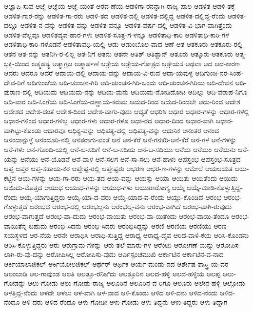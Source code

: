 {ಆಜ್ಞಾಪಿ-ಸುವ
ಆಜ್ಞೆ
ಆಜ್ಞೆಯ
ಆಜ್ಞೆ-ಯಂತೆ
ಆಠವ-ಣೆಯ
ಆಡಳಿಗಾ-ರನನ್ನಾಗಿ-ರಾಜ್ಯ-ಪಾಲ
ಆಡಳಿತ
ಆಡಳಿ-ತಕ್ಕೆ
ಆಡಳಿತ-ಗಾರ-ರನ್ನು
ಆಡಳಿತ-ಗಾ-ರರು
ಆಡಳಿ-ತದ
ಆಡಳಿತ-ದಲ್ಲಿ
ಆಡಳಿತ-ದಲ್ಲಿದ್ದ
ಆಡಳಿತ-ದಲ್ಲಿದ್ದ-ರೆಂದು
ಆಡಳಿತ-ದಲ್ಲೂ
ಆಡಳಿತ-ನ-ವನ್ನು
ಆಡಳಿತ-ವನ್ನು
ಆಡಳಿತ-ವನ್ನೂ
ಆಡಳಿತ-ವರ್ಷ-ದಲ್ಲಿ
ಆಡಳಿತ-ವಿ-ಭಾಗ-ವಾಗಿತ್ತೆಂದು
ಆಡಳಿತ-ವೆಲ್ಲವೂ
ಆಡಳಿತವ್ಯವ-ಹಾರ-ಗಳು
ಆಡಳಿತ-ಸೂತ್ರ-ಗ-ಳನ್ನೂ
ಆಡಳಿತಾಧಿ-ಕಾರಿ
ಆಡಳಿತಾಧಿ-ಕಾರಿ-ಗಳ
ಆಡಳಿತಾಧಿ-ಕಾರಿ-ಗಳೊಡನೆ
ಆಡಳಿತಾವಧಿ-ಯಲ್ಲಿ
ಆಡು
ಆಡುಂಬೊಲ-ವಾದ
ಆಣೆ
ಆತ
ಆತಕೂರು
ಆತಕೂರು-ರಲ್ಲಿ
ಆತನ
ಆತ-ನನ್ನು
ಆತನಿಗಿ-ರ-ಲಿಲ್ಲ
ಆತ-ನಿಗೆ
ಆತನು
ಆತನೇ
ಆತಿಶ್
ಆತಿಶ್ಖಾನ್
ಆತೂರು
ಆತ್ಕೂರು-ಆತಕೂರು
ಆತ್ಮ-ಭಕ್ತಿ-ಯಿಂದ
ಆತ್ಮಹತ್ಯೆ
ಆತ್ಮಾಗ್ರಜ
ಆತ್ಮಾರ್ಪಣೆ
ಆತ್ರೇಯ
ಆತ್ರೇಯ-ಗೋತ್ರದ
ಆತ್ರೇಯಸ
ಆಥವಾ
ಆದ
ಆದ-ಕಾರಣ
ಆದರು
ಆದರೂ
ಆದರೆ
ಆದಾಯ-ದಲ್ಲಿ
ಆದಾಯ-ವನ್ನು
ಆದಾಯ-ವಿ-ರುವ
ಆದಾ-ಯವುಳ್ಳ
ಆದಿಗುಂಜ-ನರ-ಸಿಂಹ-ದೇವ-ರಿಗೆ
ಆದಿಗುಂಜೆಯ
ಆದಿ-ಚುಂಚನ-ಗಿರಿ
ಆದಿ-ಚುಂಚನ-ಗಿರಿ-ಒಂದು
ಆದಿ-ಚುಂಚನ-ಗಿರಿಯ
ಆದಿ-ದೇವನ
ಆದಿ-ಪುರಾಣ-ದಲ್ಲಿ
ಆದಿಯಮ
ಆದಿಯಮ-ನನ್ನು
ಆದಿಯ-ಮನು
ಆದಿಯಮ-ನೋಡಿದೋಟ
ಆದಿಲ್ನು
ಆದಿ-ವರಾಹ-ನಿಗೂ
ಆದಿ-ವಾರ
ಆದಿ-ಸಿಂಗೆಯ
ಆದಿ-ಸಿಂಗೆಯ-ದಣ್ಣಾಯ-ಕರುಮ
ಆದುದ-ರಿಂದ
ಆದುದ-ರಿಂದಲೇ
ಆದು-ರಿಂದ
ಆದೇಶ
ಆದೇಶದ
ಆದೇಶ-ದಂತೆ
ಆದೇಶ-ದಿಂದ
ಆದೇಶ-ವಾಗು-ವುದು
ಆದ್ಯತೆ
ಆಧರಿಸಿ
ಆಧಾರ
ಆಧಾರ-ಗಳನ್ನು
ಆಧಾರ-ಗಳಲ್ಲಿ
ಆಧಾರ-ಗಳಿಂದ
ಆಧಾರ-ಗಳಿಲ್ಲ
ಆಧಾರ-ಗಳು
ಆಧಾರ-ಗಳೂ
ಆಧಾ-ರದ
ಆಧಾರ-ದಿಂದ
ಆಧಾರ-ವಾಗಿ
ಆಧಾರ-ವಾಗಿಟ್ಟು-ಕೊಂಡು
ಆಧಾರವೂ
ಆಧಿಕ್ಯ-ವನ್ನು
ಆಧಿಪತ್ಯ-ದಲ್ಲಿ
ಆಧಿಪತ್ಯ-ವನ್ನು
ಆಧುನಿಕ
ಆನಂತರ
ಆನಂದ
ಆನಂದಾನ್ಪುಳ್ಳೆ
ಆನಂದೂರಿ-ನಲ್ಲಿ
ಆನತರಾಗು-ವಂತೆ
ಆನೆ
ಆನೆ-ಕೆರೆ
ಆನೆ-ಗನಕೆರಿ-ಆನೆ-ಕೆರೆ
ಆನೆ-ಗಳ
ಆನೆ-ಗಳನ್ನು
ಆನೆ-ಗಳು
ಆನೆ-ಗೊಂದಿ-ಯಲ್ಲಿ
ಆನೆ-ಬ-ಸದಿಗೆ
ಆನೆ-ಬ-ಸದಿಯ
ಆನೆ-ಬ-ಸದಿಯು
ಆನೆಯ
ಆನೆಯಂ
ಆನೆಯನು
ಆನೆ-ಯನ್ನು
ಆನೆಯು
ಆನೆ-ಯೊಡನೆ
ಆನೆ-ವಾಳ
ಆನೆ-ಸಲಗ
ಆನೆ-ಸಾ-ಸಲು
ಆನೆ-ಹಾಳು
ಆಪಸ್ತಂಭ
ಆಪಸ್ತಂಭ-ಸೂತ್ರದ
ಆಪ್ತ
ಆಪ್ತರ
ಆಪ್ತ-ಸಹಾಯ-ಕರ
ಆಪ್ತೇಷ್ಟ-ರಲ್ಲಿ
ಆಪ್ತೇಷ್ಟರು
ಆಭರಣ
ಆಭರ-ಣ-ಗಳನ್ನು
ಆಮೇಲೆ
ಆಯಆಯತ
ಆಯ-ಕಟ್ಟಿನ
ಆಯ-ಗಳನ್ನು
ಆಯ-ಗಾ-ರರು
ಆಯ-ತದ
ಆಯ-ವನ್ನು
ಆಯಸ್ಸು
ಆಯಾ
ಆಯಿತು
ಆಯಿತೆಂದು
ಆಯಿದು
ಆಯಿದು-ಮೊತ್ತದ
ಆಯುಧ
ಆಯುಧ-ಗಳನ್ನು
ಆಯುಧ-ಗಳು
ಆಯುರಾರೋಗ್ಯ
ಆಯ್ಕೆ
ಆಯ್ಕೆ-ಮಾಡಿ-ಕೊಳ್ಳುತ್ತಿದ್ದ-ರೆಂದು
ಆಯ್ಕೆ-ಯಾಗುತ್ತಿದ್ದರು
ಆಯ್ಕೆ-ಯಾ-ದ-ವರು
ಆಯ್ಕೆ-ಯಾದ-ವ-ರೆಂದು
ಆಯ್ದು-ಕೊಂಡಿದೆ
ಆರಂಭ
ಆರಂಭ-ಗೊಳ್ಳುತ್ತದೆ
ಆರಂಭದ
ಆರಂಭ-ದಲ್ಲಿ
ಆರಂಭಲ್ಲನು
ಆರಂಭಲ್ಲ-ವನು
ಆರಂಭ-ವಾಗಿದೆ
ಆರಂಭ-ವಾಗಿ-ರುವುದು
ಆರಂಭ-ವಾಗುತ್ತದೆ
ಆರಂಭ-ವಾ-ದುದು
ಆರಂಭ-ವಾಯಿತು
ಆರಂಭ-ವಾ-ಯಿತೆಂದು
ಆರಂಭ-ವಾಯಿ-ತೆಂದೂ
ಆರಂಭ-ವಾಯಿತೆನ್ನ-ಬಹುದು
ಆರಂಭಿ-ಸಿದನು
ಆರಂಭಿ-ಸಿದರು
ಆರಂಭಿಸಿದ್ದನ್ನು
ಆರಣಿ
ಆರಣಿಯ
ಆರಣಿಯು
ಆರಣಿ-ಸಯಸ್ಥಳದ
ಆರ-ನೆಯ
ಆರನೇ
ಆರಾಧಿಸಿ
ಆರಾಧಿ-ಸುತ್ತಿದ್ದ
ಆರಾಧ್ಯ
ಆರಾಧ್ಯ-ದೈವ
ಆರಿದ-ವಾಳಿ-ಕೆಯ
ಆರಿಸಿ-ಕೊಂಡನು
ಆರಿಸಿ-ಕೊಳ್ಳುತ್ತಿದ್ದರು
ಆರು
ಆರುಗ್ರಾಮ-ಗಳನ್ನು
ಆರು-ತಲೆ-ಮಾರು-ಗಳ
ಆರೆಂಟು
ಆರೋಗಣೆ-ಯನ್ನು
ಆರೋಪಿಸ-ಲಾಗಿ-ರು-ವು-ದನ್ನು
ಆರೋಪಿಸಿಲ್ಲ
ಆರೋಪಿಸು-ವುದು
ಆರ್ಎಸ್ಪಂಚಮುಖಿ
ಆರ್ಕಾಟಿನ
ಆರ್ಕಾಟಿನ-ವ-ನಾದ
ಆರ್ಕಿಯಾಲಾಜಿಕಲ್
ಆರ್ಕಿಯೋಲಜಿಕಲ್
ಆರ್ಥರ್
ಆರ್ಥಿಕ
ಆರ್ಯ-ಮಂಡು-ನದ
ಆರ್ಶೇಷ-ಶಾಸ್ತ್ರಿ-ಯ-ವರ
ಆಲಂಬಾಡಿ
ಆಲ-ಗಾವುಂಡ
ಆಲತಿ
ಆಲತ್ತೂ-ರನಿಱಿದು
ಆಲತ್ತೂರಿನ
ಆಲದ-ಹಳ್ಳಿ
ಆಲದ-ಹಳ್ಳಿಯ
ಆಲಪ್ಪ
ಆಲು-ಗೋಡನ್ನು
ಆಲು-ಗೋಡು
ಆಲು-ಗೋಡು-ರಾಜ್ಯ
ಆಲೂರಿನ
ಆಲೂರಿನ-ವ-ರಿಗೂ
ಆಲೂರು
ಆಲೇನ-ಹಳ್ಳಿ
ಆಲ್ಗೋಡು
ಆಳತ್ತಿದ್ದ-ನೆಂದು
ಆಳದೇ
ಆಳಲು
ಆಳ-ವಾಗಿ
ಆಳ-ವಾದ
ಆಳಿ-ಕೊಂಡು
ಆಳಿದ
ಆಳಿ-ದನು
ಆಳಿದ-ನೆಂದು
ಆಳಿದ-ನೆಂದೂ
ಆಳಿ-ದರು
ಆಳಿದ-ರೆಂದೂ
ಆಳು-ಗೋಡೀ
ಆಳು-ಗೋಡು
ಆಳು-ತಿದ್ದನು
ಆಳು-ತಿದ್ದರು
ಆಳು-ತಿದ್ದಾಗ
}
